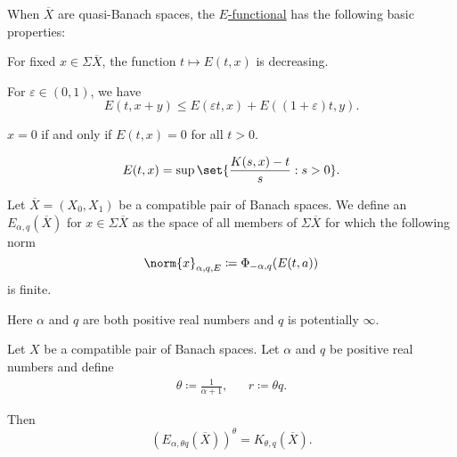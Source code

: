 \begin{proposition}\label{thm:def:e_functional}
  When \( \overline{X} \) are quasi-Banach spaces, the \hyperref[def:e_functional]{\( E \)-functional} has the following basic properties:

  \begin{thmenum}
     For fixed \( x \in \Sigma\overline{X} \), the function \( t \mapsto E(t, x) \) is decreasing.

     For \( \varepsilon \in (0, 1) \), we have
    \begin{equation*}
      E(t, x + y) \leq E(\varepsilon t, x) + E((1 + \varepsilon) t, y).
    \end{equation*}

     \( x = 0 \) if and only if \( E(t, x) = 0 \) for all \( t > 0 \).

    \begin{equation*}
      E(t, x) = \sup \set{ \frac {K(s, x) - t} s : s > 0 }.
    \end{equation*}
  \end{thmenum}
\end{proposition}

\begin{definition}\label{def:approximation_space}
  Let \( \overline{X} = (X_0, X_1) \) be a compatible pair of Banach spaces. We define an  \( E_{\alpha,q}(\overline{X}) \) for \( x \in \Sigma\overline{X} \) as the space of all members of \( \Sigma\overline{X} \) for which the following norm
  \begin{equation}\label{eq:def:approximation_space/norm}
    \norm{x}_{\alpha,q,E} \coloneqq \Phi_{-\alpha,q}(E(t,a))
  \end{equation}
  is finite.

  Here \( \alpha \) and \( q \) are both positive real numbers and \( q \) is potentially \( \infty \).
\end{definition}

\begin{theorem}\label{thm:interpolation_space_and_approximation_space}
  Let \( X \) be a compatible pair of Banach spaces. Let \( \alpha \) and \( q \) be positive real numbers and define
  \begin{align*}
    \theta \coloneqq \frac 1 {\alpha + 1},
    &&
    r \coloneqq \theta q.
  \end{align*}

  Then
  \begin{equation*}
    (E_{\alpha,\theta q}(\overline{X}))^\theta = K_{\theta,q}(\overline{X}).
  \end{equation*}
\end{theorem}

